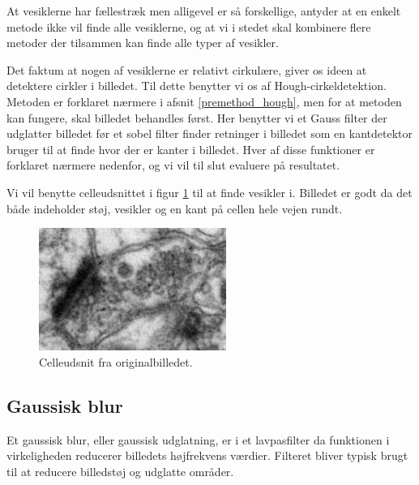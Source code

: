 At vesiklerne har fællestræk men alligevel er så forskellige, antyder at en enkelt metode ikke vil finde alle vesiklerne, og at vi i stedet skal kombinere flere metoder der tilsammen kan finde alle typer af vesikler.

Det faktum at nogen af vesiklerne er relativt cirkulære, giver os ideen at detektere cirkler i billedet. Til dette benytter vi os af Hough-cirkeldetektion. Metoden er forklaret nærmere i afsnit \ref{premethod_hough}, men for at metoden kan fungere, skal billedet behandles først. Her benytter vi et Gauss filter der udglatter billedet før et sobel filter finder retninger i billedet som en kantdetektor bruger til at finde hvor der er kanter i billedet. Hver af disse funktioner er forklaret nærmere nedenfor, og vi vil til slut evaluere på resultatet.

Vi vil benytte celleudsnittet i figur \ref{fig:premethod_celle} til at finde vesikler i. Billedet er godt da det både indeholder støj, vesikler og en kant på cellen hele vejen rundt.

\begin{figure}[H]
	\centering
	\includegraphics[scale=2.5]{files/premethod/img/celle1.png}
	\caption{Celleudsnit fra originalbilledet.\label{fig:premethod_celle}}
\end{figure}

\subsection{Gaussisk blur}
Et gaussisk blur, eller gaussisk udglatning, er i et lavpasfilter da funktionen i virkeligheden reducerer billedets højfrekvens værdier. Filteret bliver typisk brugt til at reducere billedstøj og udglatte områder. 

